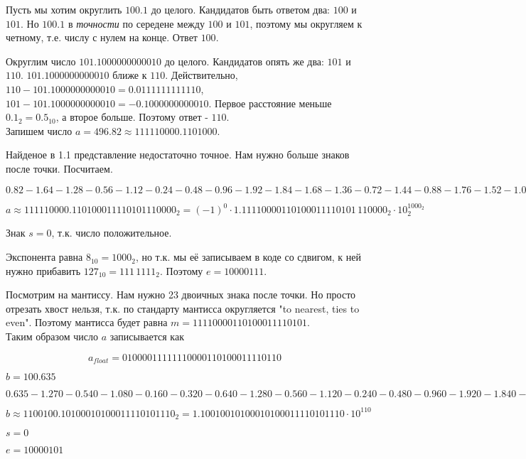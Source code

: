 \documentclass[a4paper,12pt]{article}
\begin{document}
Пусть мы хотим округлить $100.1$ до целого.
Кандидатов быть ответом два: $100$ и $101$.
Но $100.1$ в \emph{точности} по середене между $100$ и $101$, поэтому мы округляем к четному, т.е. числу с нулем на конце.
Ответ $100$.

Округлим число $101.1000000000010$ до целого.
Кандидатов опять же два: $101$ и $110$.
$101.1000000000010$ ближе к $110$.
Действительно, $110 - 101.1000000000010 = 0.0111111111110$, $101 - 101.1000000000010 = -0.1000000000010$.
Первое расстояние меньше $0.1_2 = 0.5_{10}$, а второе больше.
Поэтому ответ - $110$.
\\

Запишем число $a = 496.82 \approx 111110000.1101000$.

Найденое в 1.1 представление недостаточно точное.
Нам нужно больше знаков после точки.
Посчитаем.

$0.82 - 1.64 - 1.28 - 0.56 - 1.12 - 0.24 - 0.48 - 0.96 - 1.92 - 1.84 - 1.68 - 1.36 - 0.72 - 1.44 - 0.88 - 1.76 - 1.52 - 1.04 - 0.08 - 0.16 - 0.32 - 0.64$

$a \approx 111110000.110100011110101110000_2 = (-1)^0 \cdot 1.11110000110100011110101 \, 110000_2 \cdot 10_2^{1000_2}$

Знак $s = 0$, т.к. число положительное.

Экспонента равна $8_{10} = 1000_2$, но т.к. мы её записываем в коде со сдвигом, к ней нужно прибавить $127_{10} = 111 \, 1111_2$.
Поэтому $e = 1000 0111$.

Посмотрим на мантиссу.
Нам нужно 23 двоичных знака после точки.
Но просто отрезать хвост нельзя, т.к. по стандарту мантисса округляется "to nearest, ties to even".
Поэтому мантисса будет равна $m = 111 1000 0110 1000 1111 0101$.
\\

Таким образом число $a$ записывается как

\[a_{float} = 01000011111110000110100011110110\]





$b = 100.635$

$0.635 - 1.270 - 0.540 - 1.080 - 0.160 - 0.320 - 0.640 - 1.280 - 0.560 - 1.120 - 0.240 - 0.480 - 0.960 - 1.920 - 1.840 - 1.680 - 1.360 - 0.720 - 1.440 - 0.880 - 1.760 - 1.520 - 1.040 - 0.080$

$b \approx 1100100.10100010100011110101110_2 = 1.10010010100010100011110101110 \cdot 10^{110}$

$s = 0$

$e = 1000 0101$
\end{document}
